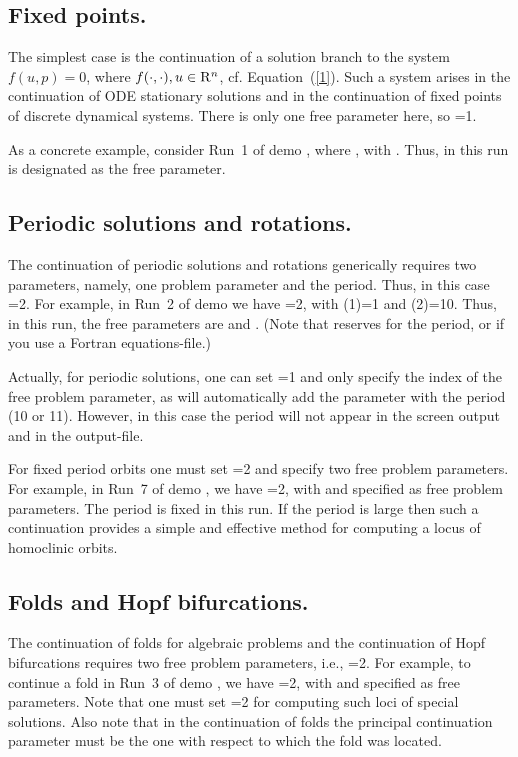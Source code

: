 \subsection{ Fixed points.}
The simplest case is the continuation of a solution branch to the system
$ f( u , p ) = 0$,  where $f(\cdot,\cdot), u \in {\rm R}^n$, cf. Equation~(\ref{1}).
Such a system arises in the continuation of ODE stationary solutions and 
in the continuation of fixed points of discrete dynamical systems.
There is only one free parameter here, so =1.

As a concrete example, consider Run~1 of demo ,
where , with . 
Thus, in this run  is designated as the free parameter.

\subsection{ Periodic solutions and rotations.}
The continuation of periodic solutions and rotations generically requires 
two parameters, namely, one problem parameter and the period.
Thus, in this case  =2.
For example, in Run~2 of demo  we have =2,
with (1)=1 and (2)=10.
Thus, in this run, the free parameters are  and .
(Note that \AUTO reserves  for the period, or
  if you use a Fortran equations-file.)

Actually, for periodic solutions, one can set =1 and only specify 
the index of the free problem parameter, as \AUTO will automatically 
add the parameter with the period (10 or 11).
However, in this case the period will not appear in the screen output 
and in the  output-file. 

For fixed period orbits one must set =2 and specify two free problem 
parameters.
For example, in Run~7 of demo , we have =2, with 
 and 
specified as free problem parameters.
The period is fixed in this run.
If the period is large then such a continuation provides a simple and 
effective method for computing a locus of homoclinic orbits.
\subsection{ Folds and Hopf bifurcations.}
The continuation of folds for algebraic problems and the continuation of
Hopf bifurcations requires two free problem parameters, i.e.,  =2.
For example, to continue a fold in Run~3 of demo , we have =2, 
with  and  specified as free parameters.
Note that one must set =2 for computing such loci of special solutions.
Also note that in the continuation of folds the principal continuation parameter
must be the one with respect to which the fold was located.

